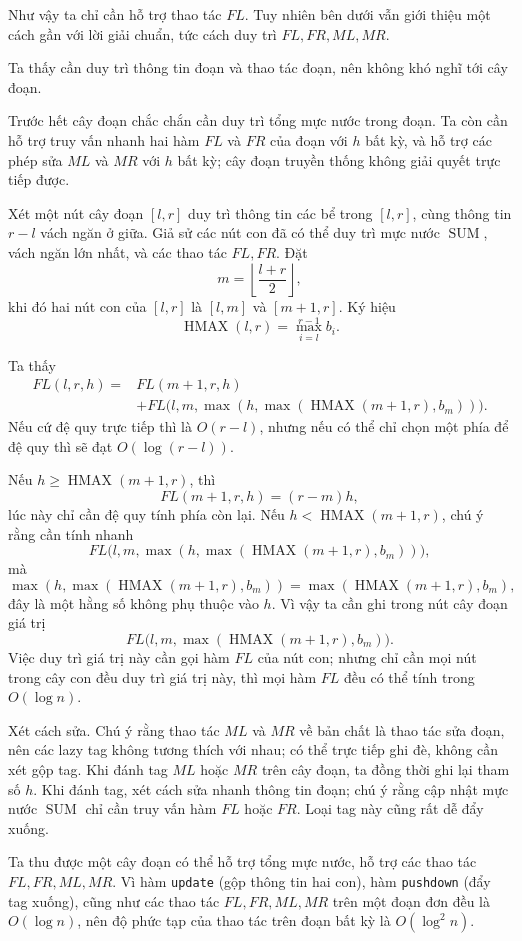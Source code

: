\documentclass[11pt]{article}
\DeclareMathOperator{\SUM}{SUM}
\DeclareMathOperator{\HMAX}{HMAX}
\begin{document}
Như vậy ta chỉ cần hỗ trợ thao tác \(FL\). Tuy nhiên bên dưới vẫn giới thiệu
một cách gần với lời giải chuẩn, tức cách duy trì \(FL,FR,ML,MR\).

Ta thấy cần duy trì thông tin đoạn và thao tác đoạn, nên không khó nghĩ tới
cây đoạn.

Trước hết cây đoạn chắc chắn cần duy trì tổng mực nước trong đoạn. Ta còn cần
hỗ trợ truy vấn nhanh hai hàm \(FL\) và \(FR\) của đoạn với \(h\) bất kỳ, và
hỗ trợ các phép sửa \(ML\) và \(MR\) với \(h\) bất kỳ; cây đoạn truyền thống
không giải quyết trực tiếp được.

Xét một nút cây đoạn \([l,r]\) duy trì thông tin các bể trong \([l,r]\), cùng
thông tin \(r-l\) vách ngăn ở giữa. Giả sử các nút con đã có thể duy trì mực
nước \(\SUM\), vách ngăn lớn nhất, và các thao tác \(FL,FR\). Đặt
\[
  m=\left\lfloor\frac{l+r}{2}\right\rfloor,
\]
khi đó hai nút con của \([l,r]\) là \([l,m]\) và \([m+1,r]\). Ký hiệu
\[
  \HMAX(l,r)=\max_{i=l}^{r-1} b_i.
\]

Ta thấy
\[
\begin{aligned}
FL(l,r,h)={}&FL(m+1,r,h)\\
&+FL\bigl(l,m,\max(h,\max(\HMAX(m+1,r),b_m))\bigr).
\end{aligned}
\]
Nếu cứ đệ quy trực tiếp thì là \(O(r-l)\), nhưng nếu có thể chỉ chọn một phía
để đệ quy thì sẽ đạt \(O(\log(r-l))\).

Nếu \(h\ge \HMAX(m+1,r)\), thì
\[
  FL(m+1,r,h)=(r-m)h,
\]
lúc này chỉ cần đệ quy tính phía còn lại. Nếu \(h<\HMAX(m+1,r)\), chú ý rằng
cần tính nhanh
\[
  FL\bigl(l,m,\max(h,\max(\HMAX(m+1,r),b_m))\bigr),
\]
mà
\[
  \max(h,\max(\HMAX(m+1,r),b_m))=\max(\HMAX(m+1,r),b_m),
\]
đây là một hằng số không phụ thuộc vào \(h\). Vì vậy ta cần ghi trong nút cây
đoạn giá trị
\[
  FL\bigl(l,m,\max(\HMAX(m+1,r),b_m)\bigr).
\]
Việc duy trì giá trị này cần gọi hàm \(FL\) của nút con; nhưng chỉ cần mọi
nút trong cây con đều duy trì giá trị này, thì mọi hàm \(FL\) đều có thể tính
trong \(O(\log n)\).

Xét cách sửa. Chú ý rằng thao tác \(ML\) và \(MR\) về bản chất là thao tác
sửa đoạn, nên các lazy tag không tương thích với nhau; có thể trực tiếp ghi
đè, không cần xét gộp tag. Khi đánh tag \(ML\) hoặc \(MR\) trên cây đoạn, ta
đồng thời ghi lại tham số \(h\). Khi đánh tag, xét cách sửa nhanh thông tin
đoạn; chú ý rằng cập nhật mực nước \(\SUM\) chỉ cần truy vấn hàm \(FL\) hoặc
\(FR\). Loại tag này cũng rất dễ đẩy xuống.

Ta thu được một cây đoạn có thể hỗ trợ tổng mực nước, hỗ trợ các thao tác
\(FL,FR,ML,MR\). Vì hàm \texttt{update} (gộp thông tin hai con), hàm
\texttt{pushdown} (đẩy tag xuống), cũng như các thao tác \(FL,FR,ML,MR\) trên
một đoạn đơn đều là \(O(\log n)\), nên độ phức tạp của thao tác trên đoạn bất
kỳ là \(O(\log^2 n)\).
\end{document}
